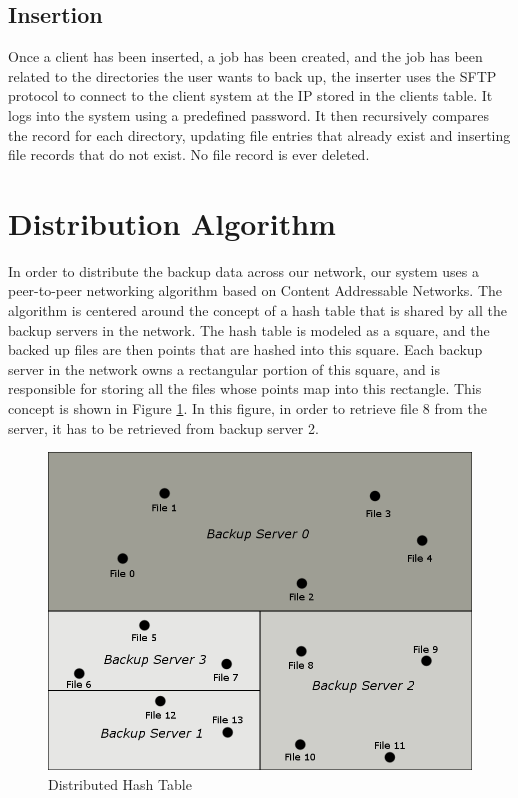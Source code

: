 \subsection{Insertion}
Once a client has been inserted, a job has been created, and the job has been related to the directories the user wants to back up, the inserter uses the SFTP protocol to connect to the client system at the IP stored in the clients table. It logs into the system using a predefined password. It then recursively compares the record for each directory, updating file entries that already exist and inserting file records that do not exist. No file record is ever deleted.

\section{Distribution Algorithm}

In order to distribute the backup data across our network, our system uses a
peer-to-peer networking algorithm based on Content Addressable Networks. \cite{scalable}
The algorithm is centered around the concept of a hash table that is shared by all the backup
servers in the network. The hash table is modeled as a square, and the backed up files are then
points that are hashed into this square. Each backup server in the network owns a rectangular portion
of this square, and is responsible for storing all the files whose points map into this rectangle.
This concept is shown in Figure \ref{fig:dht_1}. In this figure, in order to retrieve file 8 from the server,
it has to be retrieved from backup server 2.

\begin{figure}[hb]
\centering
\includegraphics[scale=0.5]{images/dht_basic.png}
\caption{Distributed Hash Table}
\label{fig:dht_1}
\end{figure}

